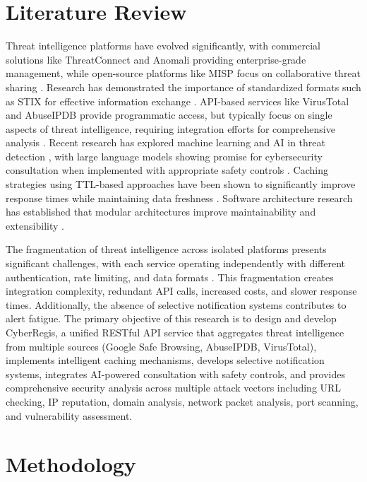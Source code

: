 \documentclass[conference]{IEEEtran}
\begin{document}
\section{Literature Review}

Threat intelligence platforms have evolved significantly, with commercial solutions like ThreatConnect and Anomali providing enterprise-grade management, while open-source platforms like MISP focus on collaborative threat sharing \cite{b10,b11}. Research has demonstrated the importance of standardized formats such as STIX for effective information exchange \cite{b4}. API-based services like VirusTotal and AbuseIPDB provide programmatic access, but typically focus on single aspects of threat intelligence, requiring integration efforts for comprehensive analysis \cite{b12}. Recent research has explored machine learning and AI in threat detection \cite{b13,b14}, with large language models showing promise for cybersecurity consultation when implemented with appropriate safety controls \cite{b15,b16}. Caching strategies using TTL-based approaches have been shown to significantly improve response times while maintaining data freshness \cite{b17,b18,b19}. Software architecture research has established that modular architectures improve maintainability and extensibility \cite{b20}.

The fragmentation of threat intelligence across isolated platforms presents significant challenges, with each service operating independently with different authentication, rate limiting, and data formats \cite{b1}. This fragmentation creates integration complexity, redundant API calls, increased costs, and slower response times. Additionally, the absence of selective notification systems contributes to alert fatigue. The primary objective of this research is to design and develop CyberRegis, a unified RESTful API service that aggregates threat intelligence from multiple sources (Google Safe Browsing, AbuseIPDB, VirusTotal), implements intelligent caching mechanisms, develops selective notification systems, integrates AI-powered consultation with safety controls, and provides comprehensive security analysis across multiple attack vectors including URL checking, IP reputation, domain analysis, network packet analysis, port scanning, and vulnerability assessment.

\section{Methodology}
\end{document}
